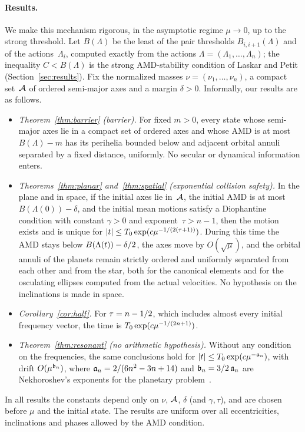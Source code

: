 \paragraph{Results.} We make this mechanism rigorous, in the asymptotic regime $\mu\to0$, up to the strong threshold. Let $B(\Lambda)$ be the least of the pair thresholds $B_{i,i+1}(\Lambda)$ and of the actions~$\Lambda_i$, computed exactly from the actions $\Lambda=(\Lambda_1,\ldots,\Lambda_n)$; the inequality $C<B(\Lambda)$ is the strong AMD-stability condition of Laskar and Petit (Section~\ref{sec:results}). Fix the normalized masses $\nu=(\nu_1,\ldots,\nu_n)$, a compact set~$\mathcal{A}$ of ordered semi-major axes and a margin $\delta>0$. Informally, our results are as follows.
\begin{itemize}
\item \emph{Theorem~\ref{thm:barrier} (barrier).} For fixed $m>0$, every state whose semi-major axes lie in a compact set of ordered axes and whose AMD is at most $B(\Lambda)-m$ has its perihelia bounded below and adjacent orbital annuli separated by a fixed distance, uniformly. No secular or dynamical information enters.
\item \emph{Theorems~\ref{thm:planar} and~\ref{thm:spatial} (exponential collision safety).} In the plane and in space, if the initial axes lie in~$\mathcal{A}$, the initial AMD is at most $B(\Lambda(0))-\delta$, and the initial mean motions satisfy a Diophantine condition with constant $\gamma>0$ and exponent~$\tau>n-1$, then the motion exists and is unique for $\lvert t\rvert\leq T_0\exp(c\mu^{-1/(2(\tau+1))})$. During this time the AMD stays below $B(\Lambda(t))-\delta/2$, the axes move by $O(\sqrt\mu)$, and the orbital annuli of the planets remain strictly ordered and uniformly separated from each other and from the star, both for the canonical elements and for the osculating ellipses computed from the actual velocities. No hypothesis on the inclinations is made in space.
\item \emph{Corollary~\ref{cor:half}.} For $\tau=n-1/2$, which includes almost every initial frequency vector, the time is $T_0\exp(c\mu^{-1/(2n+1)})$.
\item \emph{Theorem~\ref{thm:resonant} (no arithmetic hypothesis).} Without any condition on the frequencies, the same conclusions hold for $\lvert t\rvert\leq T_0\exp(c\mu^{-\mathfrak{a}_n{}})$, with drift $O(\mu^{\mathfrak{b}_n{}})$, where $\mathfrak{a}_n{}=2/(6n^2-3n+14)$ and $\mathfrak{b}_n{}=3/2\,\mathfrak{a}_n{}$ are Nekhoroshev's exponents for the planetary problem~\cite[(12.4)--(12.5)]{Nek77}.
\end{itemize}
In all results the constants depend only on $\nu$, $\mathcal{A}$, $\delta$ (and $\gamma,\tau$), and are chosen before $\mu$ and the initial state. The results are uniform over all eccentricities, inclinations and phases allowed by the AMD condition.

